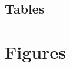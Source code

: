 \documentclass[11pt]{article}
\begin{document}
\singlespacing
\pagebreak

\nocite{*}


\pagebreak
\appendix
\begin{landscape}
\section*{Tables}
\small{}
\end{landscape}
\pagebreak

\section*{Figures}
\end{document}
